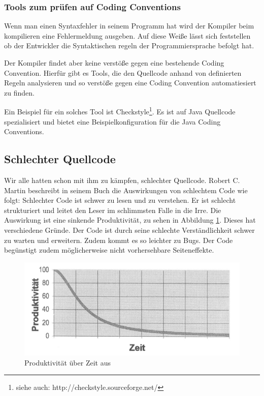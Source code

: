 \subsubsection{Tools zum prüfen auf Coding Conventions}

Wenn man einen Syntaxfehler in seinem Programm hat wird
der Kompiler beim kompilieren eine Fehlermeldung ausgeben.
Auf diese Weiße lässt sich feststellen ob der Entwickler
die Syntaktischen regeln der Programmiersprache befolgt hat.

Der Kompiler findet aber keine verstöße gegen eine bestehende Coding Convention.
Hierfür gibt es Tools, die den Quellcode anhand von definierten Regeln analysieren
und so verstöße gegen eine Coding Convention automatiesiert zu finden.

Ein Beispiel für ein solches Tool ist Checkstyle\footnote{siehe auch: http://checkstyle.sourceforge.net/}.
Es ist auf Java Quellcode spezialisiert und bietet eine Beispielkonfiguration für
die Java Coding Conventions.

\subsection{Schlechter Quellcode}


Wir alle hatten schon mit ihm zu kämpfen, schlechter Quellcode. Robert C. Martin beschreibt in seinem
Buch \cite[S. 27f.]{Martin} die Auswirkungen von schlechtem Code wie folgt: Schlechter Code ist schwer
zu lesen und zu verstehen. Er ist schlecht strukturiert und leitet den Leser im schlimmsten Falle in die Irre.
Die Auswirkung ist eine sinkende Produktivität, zu sehen in Abbildung \ref{grundlagen:produktivitaet}.
Dieses hat verschiedene Gründe. Der Code ist durch seine schlechte Verständlichkeit schwer zu warten und erweitern.
Zudem kommt es so leichter zu Bugs. Der Code begünstigt zudem möglicherweise nicht vorhersehbare Seiteneffekte.

\begin{figure}[H]
	\centering
	\includegraphics[width=\textwidth]{poduktivitaet.jpg}
	\caption{Produktivität über Zeit aus \cite[S. 29]{Martin}}
	\label{grundlagen:produktivitaet}
\end{figure}

